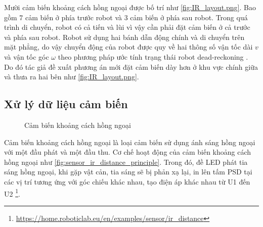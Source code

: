 Mười cảm biến khoảng cách hồng ngoại được bố trí như \figurename{\ref{fig:IR_layout.png}}. Bao gồm 7 cảm biến ở phía trước robot và 3 cảm biến ở phía sau robot.
Trong quá trình di chuyển, robot có cả tiến và lùi vì vậy cần phải đặt cảm biến ở cả trước và phía sau robot.
Robot sử dụng hai bánh dẫn động chính và di chuyển trên mặt phẳng, do vậy chuyển động của robot được quy về hai thông số vận tốc dài $v$ và vận tốc góc $\omega$ theo phương pháp ước tính trạng thái robot dead-reckoning \cite{pyo2017ros}.
Do đó tác giả đề xuất phương án mới đặt cảm biến dày hơn ở khu vực chính giữa và thưa ra hai bên như \figurename{\ref{fig:IR_layout.png}}.

\subsection{Xử lý dữ liệu cảm biến}

\begin{figure}[htbp]
    \centering
    \caption{Cảm biến khoảng cách hồng ngoại}
    \label{fig:irSharp_theory}
\end{figure}

Cảm biến khoảng cách hồng ngoại là loại cảm biến sử dụng ánh sáng hồng ngoại với một đầu phát và một đầu thu. Cơ chế hoạt động của cảm biến khoảng cách hồng ngoại như \figurename{\ref{fig:sensor_ir_distance_principle}}. Trong đó, đề LED phát tia sáng hồng ngoại, khi gặp vật cản, tia sáng sẽ bị phản xạ lại, in lên tấm PSD tại các vị trí tương ứng với góc chiếu khác nhau, tạo điện áp khác nhau từ U1 đến U2 \footnote{\url{https://home.roboticlab.eu/en/examples/sensor/ir_distance}}.

